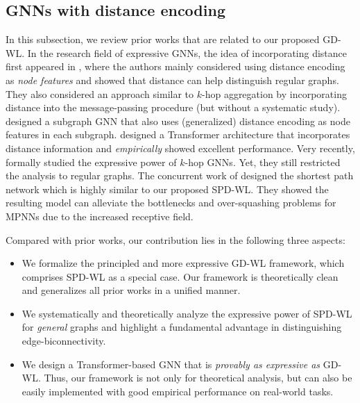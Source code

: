 \documentclass{article} %
\begin{document}
\subsection{GNNs with distance encoding}
\label{sec:related_work_distance}
In this subsection, we review prior works that are related to our proposed GD-WL. In the research field of expressive GNNs, the idea of incorporating distance first appeared in \citet{li2020distance}, where the authors mainly considered using distance encoding as \emph{node features} and showed that distance can help distinguish regular graphs. They also considered an approach similar to $k$-hop aggregation by incorporating distance into the message-passing procedure (but without a systematic study). \citet{zhang2021nested} designed a subgraph GNN that also uses (generalized) distance encoding as node features in each subgraph. \citet{ying2021transformers} designed a Transformer architecture that incorporates distance information and \emph{empirically} showed excellent performance. Very recently, \citet{feng2022powerful} formally studied the expressive power of $k$-hop GNNs. Yet, they still restricted the analysis to regular graphs. The concurrent work of \citet{abboud2022shortest} designed the shortest path network which is highly similar to our proposed SPD-WL. They showed the resulting model can alleviate the bottlenecks and over-squashing problems for MPNNs \citep{alon2021bottleneck,topping2022understanding} due to the increased receptive field. 

Compared with prior works, our contribution lies in the following three aspects:
\begin{itemize}[topsep=0pt,leftmargin=30pt]
\setlength{\itemsep}{0pt}
    \item We formalize the principled and more expressive GD-WL framework, which comprises SPD-WL as a special case. Our framework is theoretically clean and generalizes all prior works in a unified manner.
    \item We systematically and theoretically analyze the expressive power of SPD-WL for \emph{general} graphs and highlight a fundamental advantage in distinguishing edge-biconnectivity.
    \item We design a Transformer-based GNN that is \emph{provably as expressive as} GD-WL. Thus, our framework is not only for theoretical analysis, but can also be easily implemented with good empirical performance on real-world tasks.
\end{itemize}
\end{document}
